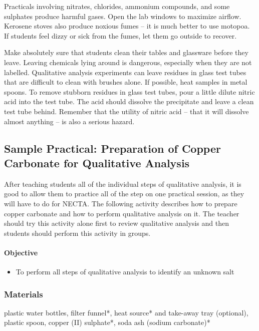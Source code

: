 Practicals involving nitrates, chlorides, ammonium compounds, and some sulphates produce harmful gases. Open the lab windows to maximize airflow. Kerosene stoves also produce noxious fumes -- it is much better to use motopoa. If students feel dizzy or sick from the fumes, let them go outside to recover.

Make absolutely sure that students clean their tables and glassware before they leave. Leaving chemicals lying around is dangerous, especially when they are not labelled. Qualitative analysis experiments can leave residues in glass test tubes that are difficult to clean with brushes alone. If possible, heat samples in metal spoons. To remove stubborn residues in glass test tubes, pour a little dilute nitric acid into the test tube. The acid should dissolve the precipitate and leave a clean test tube behind. Remember that the utility of nitric acid -- 
that it will dissolve almost anything -- is also a serious hazard.


\subsection{Sample Practical: Preparation of Copper Carbonate for Qualitative Analysis}

After teaching students all of the individual steps of qualitative analysis, it is good to allow them to practice all of the step on one practical session, as they will have to do for NECTA. The following activity describes how to prepare copper carbonate and how to perform qualitative analysis on it. The teacher should try this activity alone first to review qualitative analysis and then students should perform this activity in groups.

\paragraph{Objective}
\begin{itemize}
\item{To perform all steps of qualitative analysis to identify an unknown salt}
\end{itemize}

\subsubsection{Materials}
plastic water bottles, filter funnel*, heat source* and take-away tray (optional), plastic spoon, copper (II) sulphate*, soda ash (sodium carbonate)*

